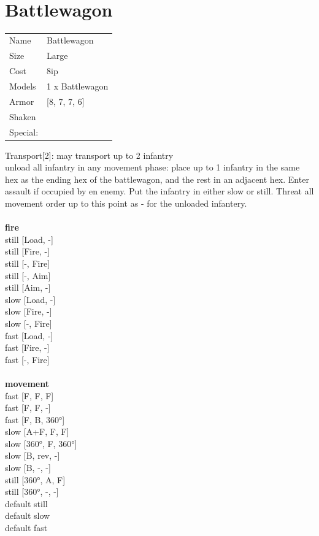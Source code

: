  
\ \\













\clearpage

\section{ Battlewagon }

\begin{tabular}{ll}
  Name & Battlewagon \\
  Size & Large\\
  Cost & 8ip\\
  Models & 1 x Battlewagon\\
  Armor & [8, 7, 7, 6]\\
  Shaken & \\
  Special: \\
\end{tabular}

\noindent Transport[2]: may transport up to 2 infantry\\ 
unload all infantry in any movement phase: place up to 1 infantry in the same hex as the ending hex of the battlewagon, and the rest in an adjacent hex. Enter assault if occupied by en enemy. Put the infantry in either slow or still. Threat all movement order up to this point as - for the unloaded infantery.\\ 


\ \\ {\bf fire } \\
still [Load, -] \\
still [Fire, -] \\
still [-, Fire] \\
still [-, Aim] \\
still [Aim, -] \\
slow [Load, -] \\
slow [Fire, -] \\
slow [-, Fire] \\
fast [Load, -] \\
fast [Fire, -] \\
fast [-, Fire] \\
\ \\ {\bf movement } \\
fast [F, F, F] \\
fast [F, F, -] \\
fast [F, B, 360°] \\
slow [A+F, F, F] \\
slow [360°, F, 360°] \\
slow [B, rev, -] \\
slow [B, -, -] \\
still [360°, A, F] \\
still [360°, -, -] \\
default still \\
default slow \\
default fast \\


